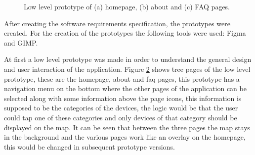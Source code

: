 \begin{figure}
\begin{subfigure}{0.33\textwidth}
        \caption{}
        \label{fig:lowfaq}
    \end{subfigure}%
    \caption{Low level prototype of (a) homepage, (b) about and (c) FAQ pages.}
    \label{fig:lowlevelprototype}
\end{figure}

After creating the software requirements specification, the prototypes were
created. For the creation of the prototypes the following tools were used: Figma
and GIMP.

At first a low level prototype was made in order to understand the
general design and user interaction of the application. Figure \ref{fig:lowlevelprototype}
shows tree pages of the low level prototype, these are the homepage, about
and faq pages, this prototype has a navigation menu on the bottom where the
other pages of the application can be selected along with some information
above the page icons, this information is supposed to be the categories of
the devices, the logic would be that the user could tap one of these categories
and only devices of that category should be displayed on the map. It can
be seen that between the three pages the map stays in the background and
the various pages work like an overlay on the homepage, this would be
changed in subsequent prototype versions.

